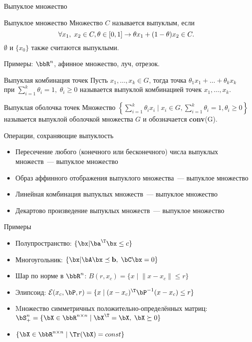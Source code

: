 \documentclass[12pt,russian]{beamer}
\begin{document}
\begin{frame}{Выпуклое множество}
\small
\begin{block}{Выпуклое множество}
Множество $C$ называется выпуклым, если 
\vspace{-4mm}
\[
\forall x_1, \; x_2 \in C, \theta \in [0, 1] \rightarrow \theta x_1 + (1 - \theta)x_2 \in C.
\vspace{-4mm}
\]
$\emptyset$ и $\{ x_0 \}$ также считаются выпуклыми.
\end{block}
Примеры: $\bbR^n$, афинное множество, луч, отрезок.
\begin{block}{Выпуклая комбинация точек}
Пусть $x_1, \ldots, x_k \in G$, тогда точка $\theta_1 x_1 + \ldots + \theta_k x_k$ при $\sum\limits_{i=1}^k \theta_i = 1, \;\theta_i \geq 0$ называется выпуклой комбинацией точек $x_1,\ldots,x_k$.
\end{block}

\begin{block}{Выпуклая оболочка точек}
Множество $\left\{ \sum\limits_{i=1}^k \theta_i x_i \; | \; x_i \in G, \sum\limits_{i=1}^k \theta_i = 1, \theta_i \geq 0 \right\}$ называется выпуклой оболочкой множества $G$ и обозначается \textbf{conv}(G).
\end{block}

\end{frame}

\begin{frame}{Операции, сохраняющие выпуклость}
\begin{itemize}
\item Пересечение любого (конечного или бесконечного) числа выпуклых множеств~--- выпуклое множество
\item Образ аффинного отображения выпуклого множества~--- выпуклое множество
\item Линейная комбинация выпуклых множеств~--- выпуклое множество
\item Декартово произведение выпуклых множеств~--- выпуклое множество
\end{itemize}
\end{frame}

\begin{frame}{Примеры}
\begin{itemize}
\item Полупространство: $\{ \bx | \ba^{\T} \bx \leq c \}$
\item Многоугольник: $\{ \bx | \bA\bx \preceq \mathbf{b}, \; \bC\bx = 0 \}$
\item Шар по норме в $\bbR^n$: $B(r, x_c) = \{ x \; | \; \| x - x_c \| \leq r \}$
\item Элипсоид: $\mathcal{E}(x_c, \bP, r) = \{ x \; | \; (x - x_c)^{\T}\bP^{-1} (x - x_c) \leq r \}$
\item Mножество симметричных положительно-определённых матриц: $\bS^n_+ = \{ \bX \in \bbR^{n \times n} \; | \; \bX^{\T} = \bX, \; \bX \succeq 0 \}$
\item $\{ \bX \in \bbR^{n \times n} \; | \; \Tr(\bX) = const \}$
\end{itemize}
\end{frame}
\end{document}
